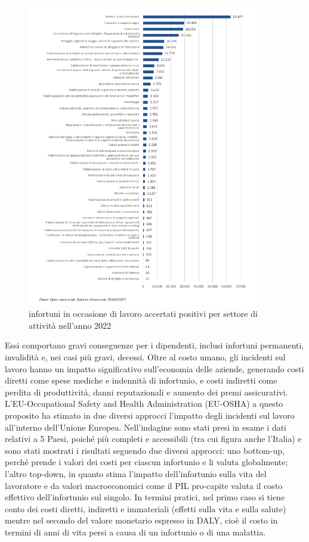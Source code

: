 \begin{figure}[htbp]
    \centering
    \includegraphics[width=0.9\textwidth]{figures/infortuni_industria_e_servizi.png}
    \caption{infortuni in occasione di lavoro accertati positivi per settore di attività nell'anno 2022}
    \label{fig:inforsplit}
\end{figure}

\noindent Essi comportano gravi conseguenze per i dipendenti, inclusi infortuni permanenti, invalidità e, nei casi più gravi, decessi. Oltre al costo umano, gli incidenti sul lavoro hanno un impatto significativo sull'economia delle aziende, generando costi diretti come spese mediche e indennità di infortunio, e costi indiretti come perdita di produttività, danni reputazionali e aumento dei premi assicurativi. L'EU-Occupational Safety and Health Administration (EU-OSHA) a questo proposito ha stimato in due diversi approcci l'impatto degli incidenti sul lavoro all'interno dell'Unione Europea\cite{b2osha-eu}. Nell'indagine sono stati presi in esame i dati relativi a 5 Paesi, poiché più completi e accessibili (tra cui figura anche l'Italia) e sono stati mostrati i risultati seguendo due diversi approcci: uno bottom-up, perché prende i valori dei costi per ciascun infortunio e li valuta globalmente; l'altro top-down, in quanto stima l'impatto dell'infortunio sulla vita del lavoratore e da valori macroeconomici come il PIL pro-capite valuta il costo effettivo dell'infortunio sul singolo. In termini pratici, nel primo caso si tiene conto dei costi diretti, indiretti e immateriali (effetti sulla vita e sulla salute) mentre nel secondo del valore monetario espresso in DALY, cioè il costo in termini di anni di vita persi a causa di un infortunio o di una malattia.

